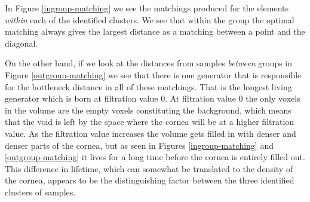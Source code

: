 In Figure \ref{ingroup-matching} we see the matchings produced for the elements \textit{within} each of the identified clusters. We see that within the group the optimal matching always gives the largest distance as a matching between a point and the diagonal.

On the other hand, if we look at the distances from samples \textit{between} groups in Figure \ref{outgroup-matching} we see that there is one generator that is responsible for the bottleneck distance in all of these matchings. That is the longest living generator which is born at filtration value $0$. At filtration value $0$ the only voxels in the volume are the empty voxels constituting the background, which means that the void is left by the space where the cornea will be at a higher filtration value. As the filtration value increases the volume gets filled in with denser and denser parts of the cornea, but as seen in Figures \ref{ingroup-matching} and \ref{outgroup-matching} it lives for a long time before the cornea is entirely filled out. This difference in lifetime, which can somewhat be translated to the density of the cornea, appears to be the distinguishing factor between the three identified clusters of samples.

